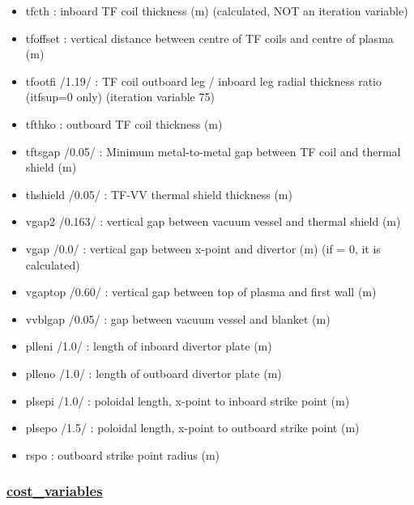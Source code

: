 \documentclass[
]{article}
\begin{document}
\begin{itemize}
\begin{itemize}
  \item
    tfcth : inboard TF coil thickness (m)
    (calculated, NOT an iteration variable)
  \item
    tfoffset : vertical distance between centre of TF coils and centre
    of plasma (m)
  \item
    tfootfi /1.19/ : TF coil outboard leg / inboard leg radial thickness
    ratio (itfsup=0 only) (iteration variable 75)
  \item
    tfthko : outboard TF coil thickness (m)
  \item
    tftsgap /0.05/ : Minimum metal-to-metal gap between TF coil and
    thermal shield (m)
  \item
    thshield /0.05/ : TF-VV thermal shield thickness (m)
  \item
    vgap2 /0.163/ : vertical gap between vacuum vessel and thermal shield (m)
  \item
    vgap /0.0/ : vertical gap between x-point and divertor (m) (if = 0,
    it is calculated)
  \item
    vgaptop /0.60/ : vertical gap between top of plasma and first wall
    (m)
  \item
    vvblgap /0.05/ : gap between vacuum vessel and blanket (m)
  \item
    plleni /1.0/ : length of inboard divertor plate (m)
  \item
    plleno /1.0/ : length of outboard divertor plate (m)
  \item
    plsepi /1.0/ : poloidal length, x-point to inboard strike point (m)
  \item
    plsepo /1.5/ : poloidal length, x-point to outboard strike point (m)
  \item
    rspo : outboard strike point radius (m)
  \end{itemize}

  \hypertarget{cost_variables}{%
  \subsubsection{\texorpdfstring{\href{cost_variables.html}{cost\_variables}}{cost\_variables}}\label{cost_variables}}


\end{itemize}
\end{document}
